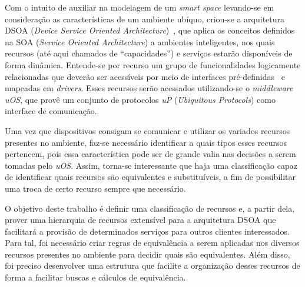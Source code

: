 Com o intuito de auxiliar na modelagem de um \emph{smart space} levando-se em consideração as características de um ambiente ubíquo, criou-se a arquitetura DSOA (\emph{Device Service Oriented Architecture})~\cite{buzetoDSOA2010}, que aplica os conceitos definidos na SOA (\emph{Service Oriented Architecture}) a ambientes inteligentes, nos quais recursos (até aqui chamados de ``capacidades'') e serviços estarão disponíveis de forma dinâmica. Entende-se por recurso um grupo de funcionalidades logicamente relacionadas que deverão ser acessíveis por meio de interfaces pré-definidas~\cite{buzeto2010} e mapeadas em \emph{drivers}. Esses recursos serão acessados utilizando-se o \emph{middleware} \emph{uOS}, que provê um conjunto de protocolos \emph{uP} (\emph{Ubiquitous Protocols}) como interface de comunicação.

Uma vez que dispositivos consigam se comunicar e utilizar os variados recursos presentes no ambiente, faz-se necessário identificar a quais tipos esses recursos pertencem, pois essa característica pode ser de grande valia nas decisões a serem tomadas pelo \emph{uOS}. Assim, torna-se interessante que haja uma classificação capaz de identificar quais recursos são equivalentes e substituíveis, a fim de possibilitar uma troca de certo recurso sempre que necessário.

O objetivo deste trabalho é definir uma classificação de recursos e, a partir dela, prover uma hierarquia de recursos extensível para a arquitetura DSOA que facilitará a provisão de determinados serviços para outros clientes interessados. Para tal, foi necessário criar regras de equivalência a serem aplicadas nos diversos recursos presentes no ambiente para decidir quais são equivalentes. Além disso, foi preciso desenvolver uma estrutura que facilite a organização desses recursos de forma a facilitar buscas e cálculos de equivalência.

